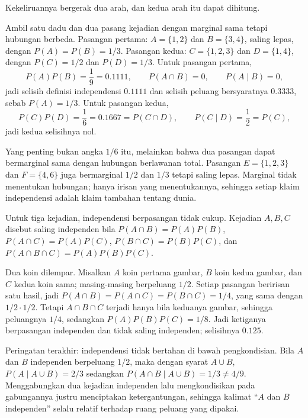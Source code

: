 Kekeliruannya bergerak dua arah, dan kedua arah itu dapat dihitung.

Ambil satu dadu dan dua pasang kejadian dengan marginal sama tetapi hubungan berbeda.
Pasangan pertama: $A=\{1,2\}$ dan $B=\{3,4\}$, saling lepas, dengan $P(A)=P(B)=1/3$.
Pasangan kedua: $C=\{1,2,3\}$ dan $D=\{1,4\}$, dengan $P(C)=1/2$ dan $P(D)=1/3$. Untuk
pasangan pertama,
\[
P(A)P(B)=\frac{1}{9}=0.1111,\qquad P(A\cap B)=0,\qquad P(A\mid B)=0,
\]
jadi selisih definisi independensi $0.1111$ dan selisih peluang bersyaratnya $0.3333$,
sebab $P(A)=1/3$. Untuk pasangan kedua,
\[
P(C)P(D)=\frac{1}{6}=0.1667=P(C\cap D),\qquad P(C\mid D)=\frac{1}{2}=P(C),
\]
jadi kedua selisihnya nol.

Yang penting bukan angka $1/6$ itu, melainkan bahwa dua pasangan dapat bermarginal sama
dengan hubungan berlawanan total. Pasangan $E=\{1,2,3\}$ dan $F=\{4,6\}$ juga bermarginal
$1/2$ dan $1/3$ tetapi saling lepas. Marginal tidak menentukan hubungan; hanya irisan
yang menentukannya, sehingga setiap klaim independensi adalah klaim tambahan tentang
dunia.

Untuk tiga kejadian, independensi berpasangan tidak cukup. Kejadian $A,B,C$ disebut
saling independen bila $P(A\cap B)=P(A)P(B)$, $P(A\cap C)=P(A)P(C)$,
$P(B\cap C)=P(B)P(C)$, dan $P(A\cap B\cap C)=P(A)P(B)P(C)$.

\begin{contoh}
Dua koin dilempar. Misalkan $A$ koin pertama gambar, $B$ koin kedua gambar, dan $C$
kedua koin sama; masing-masing berpeluang $1/2$. Setiap
pasangan beririsan satu hasil, jadi $P(A\cap B)=P(A\cap C)=P(B\cap C)=1/4$, yang sama
dengan $1/2\cdot 1/2$. Tetapi $A\cap B\cap C$ terjadi hanya bila keduanya gambar,
sehingga peluangnya $1/4$, sedangkan $P(A)P(B)P(C)=1/8$. Jadi ketiganya berpasangan
independen dan tidak saling independen; selisihnya $0.125$.
\end{contoh}

Peringatan terakhir: independensi tidak bertahan di bawah pengkondisian. Bila $A$ dan
$B$ independen berpeluang $1/2$, maka dengan syarat $A\cup B$, $P(A\mid A\cup B)=2/3$
sedangkan $P(A\cap B\mid A\cup B)=1/3\neq 4/9$. Menggabungkan dua kejadian independen
lalu mengkondisikan pada gabungannya justru menciptakan ketergantungan, sehingga kalimat
``$A$ dan $B$ independen'' selalu relatif terhadap ruang peluang yang dipakai.

